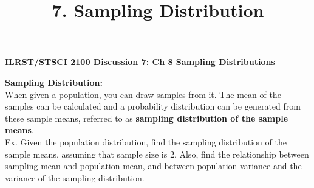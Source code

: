 \documentclass[12pt]{article}
\begin{document}
\title{7. Sampling Distribution}
\begin{center} \textbf{ILRST/STSCI 2100 Discussion 7: Ch 8 Sampling Distributions}
\end{center}


\noindent \textbf{Sampling Distribution:}\\
\noindent When given a population, you can draw samples from it. The mean of the samples can be calculated and a probability distribution can be generated from these sample means, referred to as \textbf{sampling distribution of the sample means}.\\

\noindent Ex. Given the population distribution, find the sampling distribution of the sample means, assuming that sample size is 2. Also, find the relationship between sampling mean and population mean, and between population variance and the variance of the sampling distribution.\\
\end{document}
